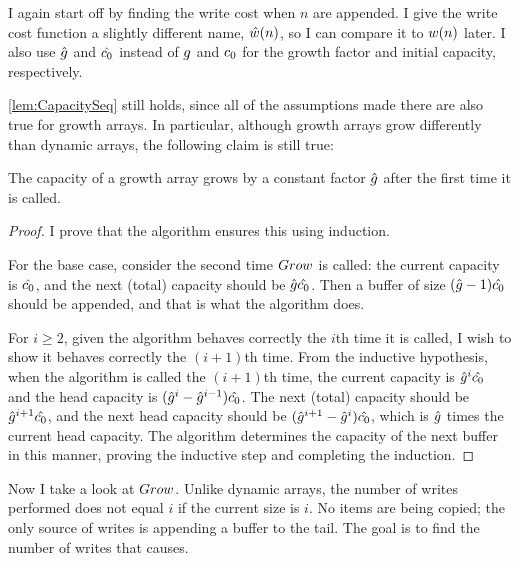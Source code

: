 \HdrGrowthArrayImpl

\HdrTimeComplex

I again start off by finding the write cost when $n$ are appended. I give the write cost function a slightly different name, $\hat{w}(n)$, so I can compare it to $w(n)$ later. I also use $\hat{g}$ and $\hat{c_0}$ instead of $g$ and $c_0$ for the growth factor and initial capacity, respectively.

\ref{lem:CapacitySeq} still holds, since all of the assumptions made there are also true for growth arrays. In particular, although growth arrays grow differently than dynamic arrays, the following claim is still true:

\begin{lemma}
	The capacity of a growth array grows by a constant factor $\hat{g}$ after the first time it is called.
\end{lemma}

\begin{proof}
	I prove that the algorithm ensures this using induction.
	
	For the base case, consider the second time $Grow$ is called: the current capacity is $\hat{c_0}$, and the next (total) capacity should be $\hat{g}\hat{c_0}$. Then a buffer of size $(\hat{g} - 1)\hat{c_0}$ should be appended, and that is what the algorithm does.
	
	For $i \geq 2$, given the algorithm behaves correctly the $i$th time it is called, I wish to show it behaves correctly the $(i + 1)$th time. From the inductive hypothesis, when the algorithm is called the $(i + 1)$th time, the current capacity is $\hat{g}^i\hat{c_0}$ and the head capacity is $(\hat{g}^i - \hat{g}^{i - 1})\hat{c_0}$. The next (total) capacity should be $\hat{g}^{i + 1}\hat{c_0}$, and the next head capacity should be $(\hat{g}^{i + 1} - \hat{g}^i)\hat{c_0}$, which is $\hat{g}$ times the current head capacity. The algorithm determines the capacity of the next buffer in this manner, proving the inductive step and completing the induction.
\end{proof}

Now I take a look at $Grow$. Unlike dynamic arrays, the number of writes performed does not equal $i$ if the current size is $i$. No items are being copied; the only source of writes is appending a buffer to the tail. The goal is to find the number of writes that causes.


